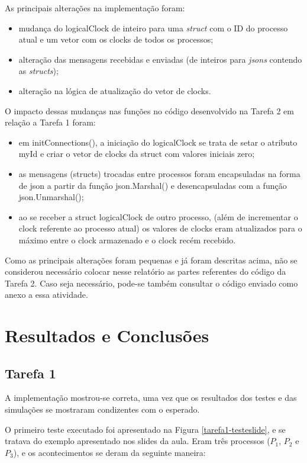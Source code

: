 \documentclass[conference]{IEEEtran}
\begin{document}
	As principais alterações na implementação foram:
\begin{itemize}
\item mudança do logicalClock de inteiro para uma \textit{struct} com o ID do processo atual e um vetor com os clocks de todos os processos;
\item alteração das mensagens recebidas e enviadas (de inteiros para \textit{jsons} contendo as \textit{structs});
\item alteração na lógica de atualização do vetor de clocks.
\end{itemize}

	O impacto dessas mudanças nas funções no código desenvolvido na Tarefa 2 em relação a Tarefa 1 foram:
	
\begin{itemize}
\item em initConnections(), a iniciação do logicalClock se trata de setar o atributo myId e criar o vetor de clocks da struct com valores iniciais zero;
\item as mensagens (structs) trocadas entre processos foram encapsuladas na forma de json a partir da função json.Marshal() e desencapsuladas com a função json.Unmarshal();
\item ao se receber a struct logicalClock de outro processo, (além de incrementar o clock referente ao processo atual) os valores de clocks eram atualizados para o máximo entre o clock armazenado e o clock recém recebido.
\end{itemize}

Como as principais alterações foram pequenas e já foram descritas acima, não se considerou necessário colocar nesse relatório as partes referentes do código da Tarefa 2. Caso seja necessário, pode-se também consultar o código enviado como anexo a essa atividade. 

\section{Resultados e Conclusões} \label{results}

\subsection{Tarefa 1}

	A implementação mostrou-se correta, uma vez que os resultados dos testes e das simulações se mostraram condizentes com o esperado.
	
	O primeiro teste executado foi apresentado na Figura \ref{tarefa1-testeslide}, e se tratava do exemplo apresentado nos slides da aula. Eram três processos ($P_1$, $P_2$ e $P_3$), e os acontecimentos se deram da seguinte maneira:
	
\end{document}
